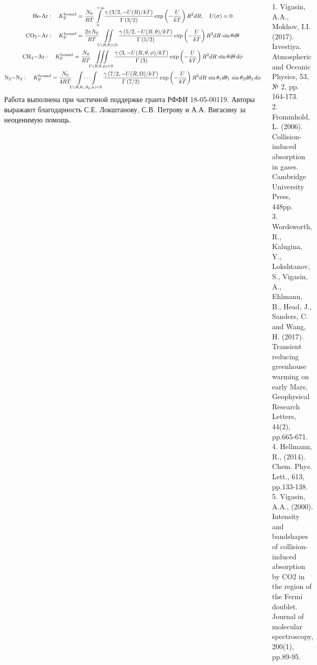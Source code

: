 \documentclass[
  14pt,
  a1paper,
  portrait, 
  margin=0mm,
  innermargin=15mm,
  blockverticalspace=0mm,
  colspace=0mm,
  subcolspace=0mm
]{tikzposter}
\newcommand{\SIZEOFTEXTREFERENCES}{\small}
\newcommand{\lb}{\left(}
\newcommand{\rb}{\right)}
\begin{document}
\begin{columns}
{	\vspace*{-1.5cm}
	\begin{gather}
		\textup{He-Ar}: \quad K_\textup{P}^\textup{bound} = \frac{N_0}{R T} \int\limits_\sigma^{+\infty} \frac{\gamma \lb 3/2, -U(R) / kT \rb}{\Gamma \lb 3/2 \rb} \exp \lb -\frac{U}{kT} \rb R^2 dR, \quad U(\sigma) = 0 \notag \\
		\textup{CO$_2-$Ar}: \quad K_\textup{P}^\textup{bound} = \frac{2 \pi N_0}{R T} \iint\limits_{U(R, \theta) < 0} \frac{\gamma \lb 5/2, -U(R, \theta) / kT \rb}{\Gamma \lb 5/2 \rb} \exp \lb - \frac{U}{kT} \rb R^2 dR \, \sin \theta d\theta \notag \\ 
		\textup{CH$_4-$Ar}: \quad K_\textup{P}^\textup{bound} = \frac{N_0}{R T} \iiint\limits_{U(R, \theta, \phi) < 0} \frac{\gamma \lb 3, -U(R, \theta, \phi) / kT \rb}{\Gamma \lb 3 \rb} \exp \lb - \frac{U}{k T} \rb R^2 d R \, \sin \theta d\theta \, d\phi \notag \\
		\textup{N$_2-$N$_2$}: \quad K_\textup{P}^\textup{bound} = \frac{N_0}{4 R T} \idotsint\limits_{U(R, \theta_1, \theta_2, \phi) < 0} \frac{\gamma \lb 7/2, - U(R, \Omega)/kT \rb}{\Gamma \lb 7/2 \rb} \exp \lb -\frac{U}{kT} \rb R^2 dR \, \sin \theta_1 d\theta_1 \, \sin \theta_2 d\theta_2 \, d\phi \notag 
	\end{gather}
}
{
	Работа выполнена при частичной поддержке гранта РФФИ 18-05-00119. Авторы выражают благодарность С.Е. Локштанову, С.В. Петрову и А.А. Вигасину за неоценимую помощь.
}

{
\SIZEOFTEXTREFERENCES
1. Vigasin, A.A., Mokhov, I.I. (2017). Izvestiya. Atmospheric and Oceanic Physics, 53, № 2, pp. 164-173. \\
2. Frommhold, L. (2006). Collision-induced absorption in gases. Cambridge University Press, 448pp. \\
3. Wordsworth, R., Kalugina, Y., Lokshtanov, S., Vigasin, A., Ehlmann, B., Head, J., Sanders, C. and Wang, H. (2017). Transient reducing greenhouse warming on early Mars, Geophysical Research Letters, 44(2), pp.665-671. \\
4. Hellmann, R., (2014). Chem. Phys. Lett., 613, pp.133-138. \\
5. Vigasin, A.A., (2000). Intensity and bandshapes of collision-induced absorption by CO2 in the region of the Fermi doublet. Journal of molecular spectroscopy, 200(1), pp.89-95.
}
\end{columns}
\end{document}
